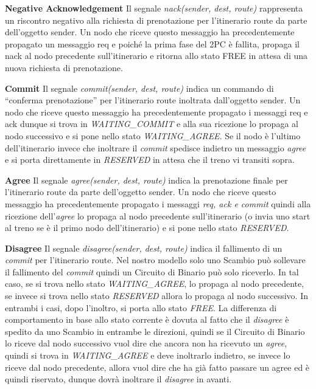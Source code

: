 \textbf{Negative Acknowledgement} Il segnale \textit{nack(sender, dest, route)}
rappresenta un riscontro negativo alla richiesta di prenotazione per l’itinerario route da parte
dell’oggetto sender. Un nodo che riceve questo messaggio ha precedentemente
propagato un messaggio req e poiché la prima fase del 2PC è fallita, propaga il
nack al nodo precedente sull’itinerario e ritorna allo stato FREE in attesa di una
nuova richiesta di prenotazione.

\textbf{Commit} Il segnale \textit{commit(sender, dest, route)} indica un
commando di “conferma prenotazione” per l’itinerario route inoltrata dall’oggetto sender. Un nodo
che riceve questo messaggio ha precedentemente propagato i messaggi req e ack
dunque si trova in \textit{WAITING\_COMMIT} e alla sua ricezione lo propaga al
nodo successivo e si pone nello stato \textit{WAITING\_AGREE}. Se il nodo è
l’ultimo dell’itinerario invece che inoltrare il \textit{commit} spedisce
indietro un messaggio \textit{agree} e si porta direttamente in
\textit{RESERVED} in attesa che il treno vi transiti sopra.

\textbf{Agree} Il segnale \textit{agree(sender, dest, route)} indica la
prenotazione finale per l’itinerario route da parte dell’oggetto sender. Un nodo che riceve questo messaggio
ha precedentemente propagato i messaggi \textit{req, ack e commit} quindi alla
ricezione dell’\textit{agree} lo propaga al nodo precedente sull’itinerario (o
invia uno start al treno se è il primo nodo dell’itinerario) e si pone nello
stato \textit{RESERVED}.

\textbf{Disagree} Il segnale \textit{disagree(sender, dest, route)} indica il
fallimento di un \textit{commit} per l’itinerario route. Nel nostro modello solo
uno Scambio può sollevare il fallimento del \textit{commit} quindi un Circuito
di Binario può solo riceverlo. In tal caso, se si trova nello stato \textit{WAITING\_AGREE}, lo propaga al nodo precedente, se invece si trova nello stato \textit{RESERVED} allora lo propaga al nodo successivo. In
entrambi i casi, dopo l’inoltro, si porta allo stato \textit{FREE}. La
differenza di comportamento in base allo stato corrente è dovuta al fatto che il
\textit{disagree} è spedito da uno Scambio in entrambe le direzioni, quindi se il Circuito di Binario lo riceve dal nodo successivo vuol dire che ancora non ha ricevuto un \textit{agree}, quindi si trova in
\textit{WAITING\_AGREE} e deve inoltrarlo indietro, se invece lo riceve dal nodo precedente,
allora vuol dire che ha già fatto passare un agree ed è quindi riservato, dunque
dovrà inoltrare il \textit{disagree} in avanti.


